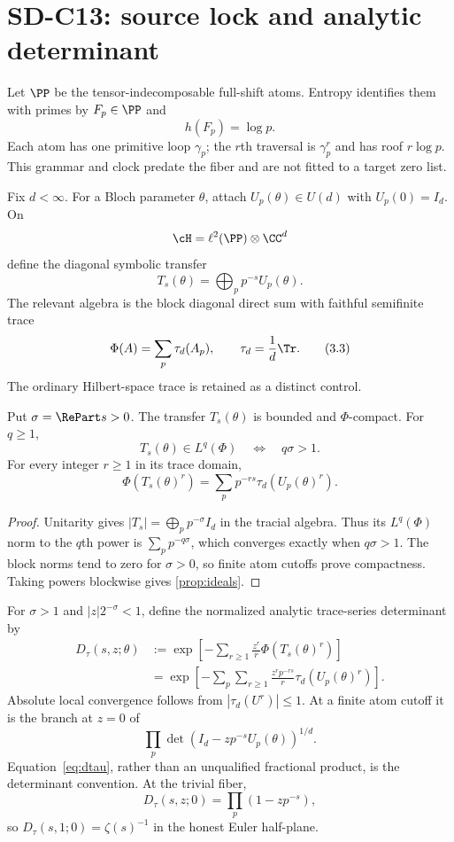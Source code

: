 \section{SD-C13: source lock and analytic determinant}
\label{sec:source}

Let $\PP$ be the tensor-indecomposable full-shift atoms.  Entropy identifies
them with primes by $F_p\in\PP$ and
\[
 h(F_p)=\log p.                                             \tag{3.1}
\]
Each atom has one primitive loop $\gamma_p$; the $r$th traversal is
$\gamma_p^r$ and has roof $r\log p$.  This grammar and clock predate the
fiber and are not fitted to a target zero list.

Fix $d<\infty$.  For a Bloch parameter $\theta$, attach
$U_p(\theta)\in U(d)$ with $U_p(0)=I_d$.  On
\[
 \cH=\ell^2(\PP)\otimes\CC^d
\]
define the diagonal symbolic transfer
\[
 T_s(\theta)=\bigoplus_{p}p^{-s}U_p(\theta).                \tag{3.2}
\]
The relevant algebra is the block diagonal direct sum with faithful
semifinite trace
\[
 \Phi(A)=\sum_p\tau_d(A_p),\qquad \tau_d=\frac1d\Tr.        \tag{3.3}
\]
The ordinary Hilbert-space trace is retained as a distinct control.

\begin{proposition}
\label{prop:ideals}
Put $\sigma=\RePart s>0$.  The transfer $T_s(\theta)$ is bounded and
$\Phi$-compact.  For $q\ge1$,
\[
 T_s(\theta)\in L^q(\Phi)
 \quad\Longleftrightarrow\quad q\sigma>1.                  \tag{3.4}
\]
For every integer $r\ge1$ in its trace domain,
\[
 \Phi(T_s(\theta)^r)
 =\sum_pp^{-rs}\tau_d(U_p(\theta)^r).                       \tag{3.5}
\]
\end{proposition}

\begin{proof}
Unitarity gives
$|T_s|=\bigoplus_pp^{-\sigma}I_d$ in the tracial algebra.  Thus its
$L^q(\Phi)$ norm to the $q$th power is $\sum_pp^{-q\sigma}$, which converges
exactly when $q\sigma>1$.  The block norms tend to zero for $\sigma>0$, so
finite atom cutoffs prove compactness.  Taking powers blockwise gives
\cref{prop:ideals}.
\end{proof}

For $\sigma>1$ and $|z|2^{-\sigma}<1$, define the normalized analytic
trace-series determinant by
\begin{align}
 D_\tau(s,z;\theta)
 &:=\exp\left[-\sum_{r\ge1}\frac{z^r}{r}
          \Phi(T_s(\theta)^r)\right]                         \tag{3.6}\label{eq:dtau}\\
 &=\exp\left[-\sum_p\sum_{r\ge1}
       \frac{z^rp^{-rs}}r\tau_d(U_p(\theta)^r)\right].       \tag{3.7}
\end{align}
Absolute local convergence follows from $|\tau_d(U^r)|\le1$.  At a finite
atom cutoff it is the branch at $z=0$ of
\[
 \prod_p\det(I_d-zp^{-s}U_p(\theta))^{1/d}.                 \tag{3.8}
\]
Equation~\eqref{eq:dtau}, rather than an unqualified fractional product, is
the determinant convention.  At the trivial fiber,
\[
 D_\tau(s,z;0)=\prod_p(1-zp^{-s}),                           \tag{3.9}
\]
so $D_\tau(s,1;0)=\zeta(s)^{-1}$ in the honest Euler
half-plane.

